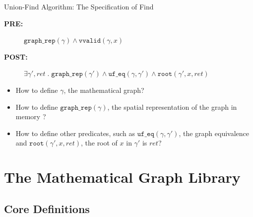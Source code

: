 \documentclass[usenames, xcolor=dvipsnames]{beamer}
\begin{document}
{\begin{frame}{Union-Find Algorithm: The Specification of Find}
  \centering
  \colorbox{lightg}{\parbox{.9\textwidth}{
      \begin{description}
      \item[{\bf PRE:}] $\mathtt{graph\_rep}(\gamma) \wedge \mathtt{vvalid}(\gamma, x)$
      \item[{\bf POST:}] $\exists \gamma', \mathit{ret}\;\text{.}\;\mathtt{graph\_rep}(\gamma')\wedge\mathtt{uf\_eq}(\gamma, \gamma') \wedge \mathtt{root}(\gamma', x, \mathit{ret})$
  \end{description}}}
  \pause
  \vskip10pt
  \colorbox{lightg}{\parbox{.9\textwidth}{
      \begin{itemize}[<+->]
      \item How to define $\gamma$, the mathematical graph?
      \item How to define $\mathtt{graph\_rep}(\gamma)$, the spatial
        representation of the graph in memory ?
      \item How to define other predicates, such as
        $\mathtt{uf\_eq}(\gamma, \gamma')$, the graph equivalence and
        $\mathtt{root}(\gamma', x, \mathit{ret})$, the root of $x$ in $\gamma'$
        is $\mathit{ret}$?
      \end{itemize}
    }}
\end{frame}

\section{The Mathematical Graph Library}
\subsection{Core Definitions}

}
\end{document}
